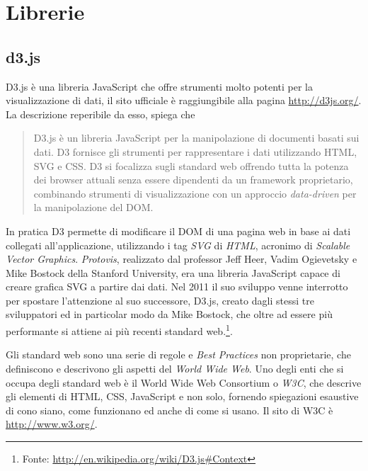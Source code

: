 \section{Librerie}
\subsection{d3.js}\label{sec:d3}
D3.js è una libreria JavaScript che offre strumenti molto potenti per la visualizzazione di dati, il sito ufficiale è raggiungibile alla pagina \url{http://d3js.org/}. La descrizione reperibile da esso, spiega che
\begin{quotation}
D3.js è un libreria JavaScript per la manipolazione di documenti basati sui dati. D3 fornisce gli strumenti per rappresentare i dati utilizzando HTML, SVG e CSS. D3 si focalizza sugli standard web offrendo tutta la potenza dei browser attuali senza essere dipendenti da un framework proprietario, combinando strumenti di visualizzazione con un approccio \emph{data-driven} per la manipolazione del DOM.
\end{quotation}
In pratica D3 permette di modificare il DOM di una pagina web in base ai dati collegati all'applicazione, utilizzando i tag \emph{SVG} di \emph{HTML}, acronimo di \emph{Scalable Vector Graphics}.
\emph{Protovis}, realizzato dal professor Jeff Heer, Vadim Ogievetsky e Mike Bostock della Stanford University, era una libreria JavaScript capace di creare grafica SVG a partire dai dati. Nel 2011 il suo sviluppo venne interrotto per spostare l'attenzione al suo successore, D3.js, creato dagli stessi tre sviluppatori ed in particolar modo da Mike Bostock, che oltre ad essere più performante si attiene ai più recenti standard web.\footnote{Fonte: \url{http://en.wikipedia.org/wiki/D3.js\#Context}}. 

Gli standard web sono una serie di regole e \emph{Best Practices} non proprietarie, che definiscono e descrivono gli aspetti del \emph{World Wide Web}. Uno degli enti che si occupa degli standard web è il World Wide Web Consortium o \emph{W3C}, che descrive gli elementi di HTML, CSS, JavaScript e non solo, fornendo spiegazioni esaustive di cono siano, come funzionano ed anche di come si usano. Il sito di W3C è \url{http://www.w3.org/}.

